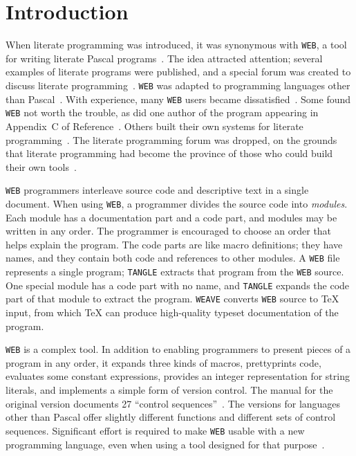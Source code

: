 \section{Introduction}
When literate programming was
introduced, it was synonymous with {\tt WEB}, a tool
for writing literate Pascal programs~\cite{knuth:literate}.
The idea attracted attention; several examples of literate
programs were published, and a special forum was created to discuss literate
programming~\cite{denning:announcing,gries:pearls,bentley:lp1,bentley:lp2}.
{\tt WEB} was  adapted to programming languages other than
Pascal~\cite{guntermann:cweb,levy:cweb,ramsey:building,sewell:mangle,thimbleby:cweb}.
%
With experience, many {\tt WEB} users became dissatisfied~\cite{ramsey:literate}. 
Some found {\tt WEB} not worth the trouble, as did
one author of the program appearing in Appendix~C
of Reference~.
Others built their own systems for literate
 programming~\cite{hamilton:expanding,cvw:loom}. 
The literate programming forum was dropped, on the grounds that
literate programming had become the province of those who could build
their own tools~\cite{cvw:assessment}.

{\tt WEB}  programmers
 interleave source code and descriptive text in a single document.
When using {\tt WEB}, a programmer divides the source code into
{\em modules}.
Each module has a documentation part and a code part, and
modules may be written in any order.
The programmer is encouraged to choose an order that helps explain the program.
The code parts are like macro definitions;  they have names, and they contain
both code and references to other modules.
A {\tt WEB} file represents a single program;
{\tt TANGLE}  extracts that program from the {\tt WEB} source. 
One special module has a code part with no name, and {\tt TANGLE}
expands the code part of that module to extract the program.
{\tt WEAVE} converts {\tt WEB} source to
{\TeX} input, from which {\TeX} can produce high-quality typeset
documentation of the program.


{\tt WEB} is a complex tool.
In addition to enabling programmers to present pieces of a program in
any order, it expands three kinds of macros, prettyprints code,
evaluates some constant expressions,
provides an integer representation for string literals, and implements
a simple form of version control.
The manual for the original version documents 27 ``control sequences''~\cite{knuth:web}.
The versions for languages other than Pascal offer slightly different
functions and different sets of control sequences.
Significant effort is required to make {\tt WEB} usable with a new
programming language, even when using a tool designed for that
purpose~\cite{ramsey:building}. 

